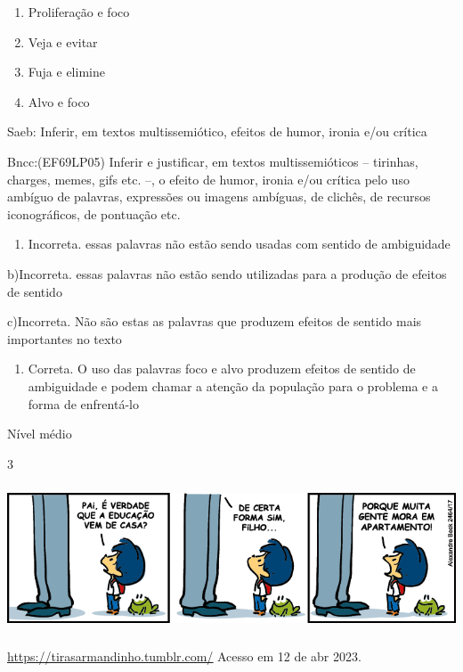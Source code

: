 {{\begin{escolha}
\begin{enumerate}
\def\labelenumi{\alph{enumi})}
\item
  Proliferação e foco
\item
  Veja e evitar
\item
  Fuja e elimine
\item
  Alvo e foco
\end{enumerate}

Saeb: Inferir, em textos multissemiótico, efeitos de humor, ironia e/ou
crítica

Bncc:(EF69LP05) Inferir e justificar, em textos multissemióticos --
tirinhas, charges, memes, gifs etc. --, o efeito de humor, ironia e/ou
crítica pelo uso ambíguo de palavras, expressões ou imagens ambíguas, de
clichês, de recursos iconográficos, de pontuação etc.

\begin{enumerate}
\def\labelenumi{\arabic{enumi}.}
\tightlist
\item
  Incorreta. essas palavras não estão sendo usadas com sentido de
  ambiguidade
\end{enumerate}

b)Incorreta. essas palavras não estão sendo utilizadas para a produção
de efeitos de sentido

c)Incorreta. Não são estas as palavras que produzem efeitos de sentido
mais importantes no texto

\begin{enumerate}
\def\labelenumi{\arabic{enumi}.}
\tightlist
\item
  Correta. O uso das palavras foco e alvo produzem efeitos de sentido de
  ambiguidade e podem chamar a atenção da população para o problema e a
  forma de enfrentá-lo
\end{enumerate}

Nível médio

\num{3}

\includegraphics[width=5.90551in,height=1.70833in]{./imgSAEB_7_POR/media/image7.png}

\href{https://tirasarmandinho.tumblr.com/}{\uline{https://tirasarmandinho.tumblr.com/}}
Acesso em 12 de abr 2023.


\end{escolha}}}
